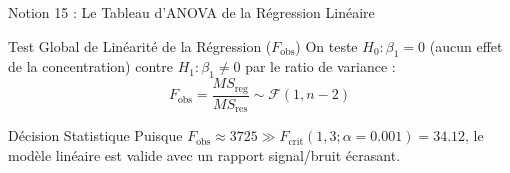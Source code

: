 \documentclass[aspectratio=169,10pt]{beamer}
\begin{document}
\begin{frame}{Notion 15 : Le Tableau d'ANOVA de la Régression Linéaire}
  \begin{conceptbox}{Test Global de Linéarité de la Régression ($F_{\text{obs}}$)}
    \footnotesize
    On teste $H_0 : \beta_1 = 0$ (aucun effet de la concentration) contre $H_1 : \beta_1 \neq 0$ par le ratio de variance :
    \begin{equation*}
      F_{\text{obs}} = \frac{MS_{\text{reg}}}{MS_{\text{res}}} \sim \mathcal{F}(1, n - 2)
    \end{equation*}
  \end{conceptbox}
  \vspace{1mm}
  \begin{center}
  \end{center}
  \vspace{1mm}
  \begin{takeawaybox}{Décision Statistique}
    \scriptsize
    Puisque $F_{\text{obs}} \approx 3725 \gg F_{\text{crit}}(1, 3; \alpha=0.001) = 34.12$, le modèle linéaire est valide avec un rapport signal/bruit écrasant.
  \end{takeawaybox}
\end{frame}
\end{document}
